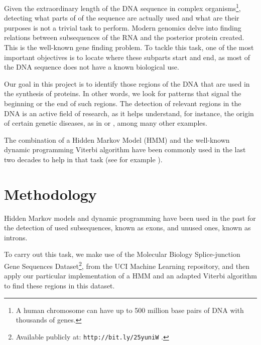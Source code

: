 \documentclass[a4paper, 11pt]{article} %
\begin{document}
Given the extraordinary length of the DNA sequence in complex organisms\footnote{A human chromosome can have up to 500 million base pairs of DNA with thousands of genes.}, detecting what parts of of the sequence are actually used and what are their purposes is not a trivial task to perform. Modern genomics delve into finding relations between subsequences of the RNA and the posterior protein created. This is the well-known gene finding problem. To tackle this task, one of the most important objectives is to locate where these subparts start and end, as most of the DNA sequence does not have a known biological use.

Our goal in this project is to identify those regions of the DNA that are used in the synthesis of proteins. In other words, we look for patterns that signal the beginning or the end of such regions. The detection of relevant regions in the DNA is an active field of research, as it helps understand, for instance, the origin of certain genetic diseases, as in \cite{scheper} or \cite{calon}, among many other examples.

The combination of a Hidden Markov Model (HMM) and the well-known dynamic programming Viterbi algorithm have been commonly used in the last two decades to help in that task (see for example \cite{henderson}).

\section*{Methodology}

Hidden Markov models and dynamic programming have been used in the past for the detection of used subsequences, known as exons, and unused ones, known as introns. 

To carry out this task, we make use of the Molecular Biology Splice-junction Gene Sequences Dataset\footnote{Available publicly at: \texttt{http://bit.ly/25yuniW} \cite{lichman}.}, from the UCI Machine Learning repository, and then apply our particular implementation of a HMM and an adapted Viterbi algorithm to find these regions in this dataset.
\end{document}
